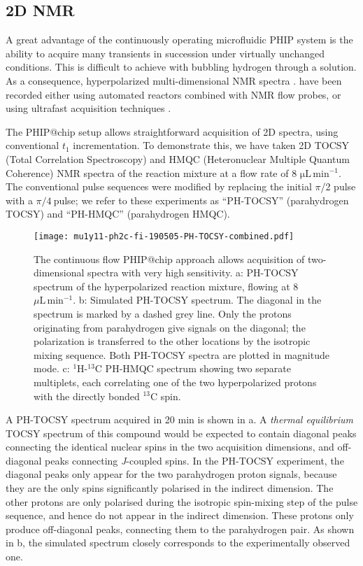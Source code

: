 \subsection{2D NMR}

A great advantage of the continuously operating microfluidic PHIP system is the
ability to acquire many transients in succession under virtually unchanged
conditions.
This is difficult to achieve with bubbling hydrogen through a solution.
As a consequence, hyperpolarized multi-dimensional NMR spectra \cite{Mishkovsky:2008cl,Giraudeau:2009fn,Roth:2010hk,Lloyd:2012cf,Eshuis:2015ce,Kiryutin:2019hy}. have been recorded
either using automated reactors combined with NMR flow probes, \cite{Lloyd:2012cf,Eshuis:2015ce}
or using ultrafast acquisition techniques \cite{Mishkovsky:2008cl,Giraudeau:2009fn,Kiryutin:2019hy}.

The PHIP@chip setup allows straightforward acquisition of 2D spectra, using
conventional $t_1$ incrementation.
To demonstrate this, we have taken 2D TOCSY (Total Correlation
Spectroscopy) and HMQC (Heteronuclear Multiple Quantum Coherence) NMR spectra
of the reaction mixture at a flow rate of 8 $\mathrm{\mu L\,min^{-1}}$.
The conventional
pulse sequences were modified by replacing the initial \(\pi\)/2 pulse with a
\(\pi/4\ \)pulse; we refer to these experiments as ``PH-TOCSY'' (parahydrogen TOCSY) and
``PH-HMQC'' (parahydrogen HMQC).

\begin{figure}
	\centering
	\texttt{[image: mu1y11-ph2c-fi-190505-PH-TOCSY-combined.pdf]}
	\caption{
		The continuous flow PHIP@chip approach allows acquisition of
		two-dimensional spectra with very high sensitivity.
    a: PH-TOCSY spectrum of the hyperpolarized reaction mixture,
		flowing at 8~$\mu\mathrm{L}\,\text{min}^{-1}$.
    b: Simulated PH-TOCSY spectrum. The diagonal in the spectrum is marked by a dashed grey
		line. Only the protons originating from parahydrogen give signals on
		the diagonal; the polarization is transferred to the other locations by
		the isotropic mixing sequence. Both PH-TOCSY spectra are plotted in
    magnitude mode.
    c: $^1$H-$^{13}$C PH-HMQC spectrum
		showing two separate multiplets, each correlating one of the two
		hyperpolarized protons with the directly bonded $^{13}$C spin.
}
	\label{fig:PH-TOCSY-HMQC}
\end{figure}

A PH-TOCSY spectrum acquired in 20 min is shown in a.
A \emph{thermal equilibrium} TOCSY spectrum of this compound would be
expected to
contain diagonal peaks connecting the identical nuclear spins in the two
acquisition dimensions, and off-diagonal peaks connecting \emph{J}-coupled
spins. In the PH-TOCSY experiment, the diagonal peaks only appear
for the two parahydrogen proton signals, because they are the only spins
significantly polarised in the indirect dimension. The other protons
are only polarised during the isotropic spin-mixing step of the pulse sequence,
and hence do not appear in the indirect dimension. These protons only produce
off-diagonal peaks, connecting them to the parahydrogen pair.
As shown in b, the simulated spectrum
closely corresponds to the experimentally observed one.

